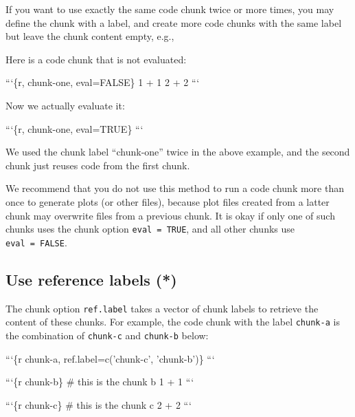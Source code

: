 \documentclass[
  11pt,
]{krantz}
\newenvironment{Shaded}{\begin{snugshade}}{\end{snugshade}}
\newcommand{\BaseNTok}[1]{\textcolor[rgb]{0.06,0.06,0.06}{#1}}
\newcommand{\NormalTok}[1]{#1}
\begin{document}
If you want to use exactly the same code chunk twice or more times, you may define the chunk with a label, and create more code chunks with the same label but leave the chunk content empty, e.g.,

\begin{Shaded}
\begin{Highlighting}[]
\NormalTok{Here is a code chunk that is not evaluated:}

\BaseNTok{```\{r, chunk-one, eval=FALSE\}}
\BaseNTok{1 + 1}
\BaseNTok{2 + 2}
\BaseNTok{```}

\NormalTok{Now we actually evaluate it:}

\BaseNTok{```\{r, chunk-one, eval=TRUE\}}
\BaseNTok{```}
\end{Highlighting}
\end{Shaded}

We used the chunk label ``chunk-one'' twice in the above example, and the second chunk just reuses code from the first chunk.

We recommend that you do not use this method to run a code chunk more than once to generate plots (or other files), because plot files created from a latter chunk may overwrite files from a previous chunk. It is okay if only one of such chunks uses the chunk option \texttt{eval\ =\ TRUE}, and all other chunks use \texttt{eval\ =\ FALSE}.

\hypertarget{ref-label}{%
\subsection{Use reference labels (*)}\label{ref-label}}

The chunk option \texttt{ref.label} takes a vector of chunk labels to retrieve the content of these chunks. For example, the code chunk with the label \texttt{chunk-a} is the combination of \texttt{chunk-c} and \texttt{chunk-b} below:

\begin{Shaded}
\begin{Highlighting}[]
\BaseNTok{```\{r chunk-a, ref.label=c('chunk-c', 'chunk-b')\}}
\BaseNTok{```}

\BaseNTok{```\{r chunk-b\}}
\BaseNTok{# this is the chunk b}
\BaseNTok{1 + 1}
\BaseNTok{```}

\BaseNTok{```\{r chunk-c\}}
\BaseNTok{# this is the chunk c}
\BaseNTok{2 + 2}
\BaseNTok{```}
\end{Highlighting}
\end{Shaded}
\end{document}
